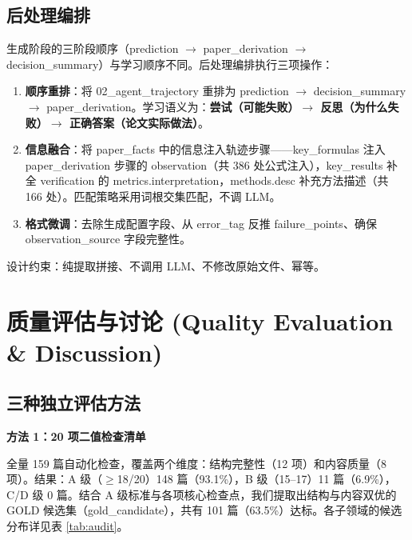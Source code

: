 \documentclass[12pt,a4paper]{article}
\begin{document}
\subsection{后处理编排}

生成阶段的三阶段顺序（prediction $\rightarrow$ paper\_derivation $\rightarrow$ decision\_summary）与学习顺序不同。后处理编排执行三项操作：

\begin{enumerate}
\item \textbf{顺序重排}：将 02\_agent\_trajectory 重排为 prediction $\rightarrow$ decision\_summary $\rightarrow$ paper\_derivation。学习语义为：\textbf{尝试（可能失败）$\rightarrow$ 反思（为什么失败）$\rightarrow$ 正确答案（论文实际做法）}。
\item \textbf{信息融合}：将 paper\_facts 中的信息注入轨迹步骤——key\_formulas 注入 paper\_derivation 步骤的 observation（共 386 处公式注入），key\_results 补全 verification 的 metrics.interpretation，methods.desc 补充方法描述（共 166 处）。匹配策略采用词根交集匹配，不调 LLM。
\item \textbf{格式微调}：去除生成配置字段、从 error\_tag 反推 failure\_points、确保 observation\_source 字段完整性。
\end{enumerate}

设计约束：纯提取拼接、不调用 LLM、不修改原始文件、幂等。

\section{质量评估与讨论 (Quality Evaluation \& Discussion)}

\subsection{三种独立评估方法}

\textbf{方法 1：20 项二值检查清单}

全量 159 篇自动化检查，覆盖两个维度：结构完整性（12 项）和内容质量（8 项）。结果：A 级（$\geq$18/20）148 篇（93.1\%），B 级（15--17）11 篇（6.9\%），C/D 级 0 篇。结合 A 级标准与各项核心检查点，我们提取出结构与内容双优的 GOLD 候选集（gold\_candidate），共有 101 篇（63.5\%）达标。各子领域的候选分布详见表 \ref{tab:audit}。
\end{document}
